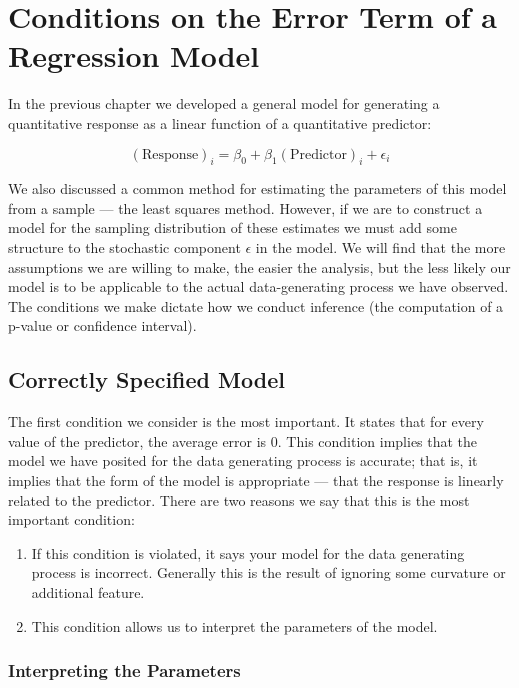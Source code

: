 \documentclass[
]{book}
\providecommand{\tightlist}{%
  \setlength{\itemsep}{0pt}\setlength{\parskip}{0pt}}
\theoremstyle{plain}
\theoremstyle{mydefn}
\theoremstyle{myexmpl}
\theoremstyle{remark}
\begin{document}
\hypertarget{Regconditions}{%
\chapter{Conditions on the Error Term of a Regression Model}\label{Regconditions}}

In the previous chapter we developed a general model for generating a quantitative response as a linear function of a quantitative predictor:

\[(\text{Response})_i = \beta_0 + \beta_1 (\text{Predictor})_{i} + \epsilon_i\]

We also discussed a common method for estimating the parameters of this model from a sample --- the least squares method. However, if we are to construct a model for the sampling distribution of these estimates we must add some structure to the stochastic component \(\epsilon\) in the model. We will find that the more assumptions we are willing to make, the easier the analysis, but the less likely our model is to be applicable to the actual data-generating process we have observed. The conditions we make dictate how we conduct inference (the computation of a p-value or confidence interval).

\hypertarget{correctly-specified-model}{%
\section{Correctly Specified Model}\label{correctly-specified-model}}

The first condition we consider is the most important. It states that for every value of the predictor, the average error is 0. This condition implies that the model we have posited for the data generating process is accurate; that is, it implies that the form of the model is appropriate --- that the response is linearly related to the predictor. There are two reasons we say that this is the most important condition:

\begin{enumerate}
\def\labelenumi{\arabic{enumi}.}
\tightlist
\item
  If this condition is violated, it says your model for the data generating process is incorrect. Generally this is the result of ignoring some curvature or additional feature.
\item
  This condition allows us to interpret the parameters of the model.
\end{enumerate}

\hypertarget{interpreting-the-parameters}{%
\subsection{Interpreting the Parameters}\label{interpreting-the-parameters}}
\end{document}
